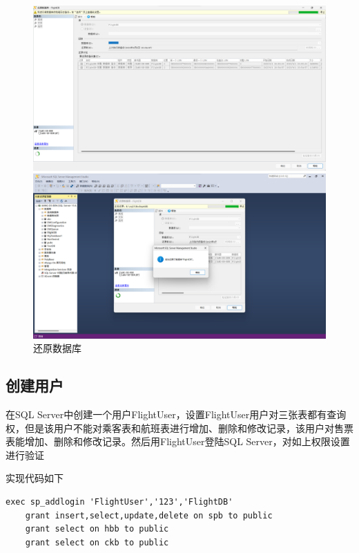 \documentclass[UTF8,12pt]{article}
\begin{document}
\begin{figure}[htbp]
    \centering
	\begin{minipage}{0.8\linewidth}
		\centering
		\includegraphics[width=0.9\linewidth]{img/13.png}
	\end{minipage}
	\begin{minipage}{0.8\linewidth}
		\centering
		\includegraphics[width=0.9\linewidth]{img/14.png}
	\end{minipage}
    \caption{还原数据库}
\end{figure}

\subsection{创建用户}
在SQL Server中创建一个用户FlightUser，设置FlightUser用户对三张表都有查询权，但是该用户不能对乘客表和航班表进行增加、删除和修改记录，该用户对售票表能增加、删除和修改记录。然后用FlightUser登陆SQL Server，对如上权限设置进行验证

实现代码如下
\begin{lstlisting}[title=创建用户,frame=shadowbox]
    exec sp_addlogin 'FlightUser','123','FlightDB'
    grant insert,select,update,delete on spb to public
    grant select on hbb to public
    grant select on ckb to public
\end{lstlisting}
\end{document}
